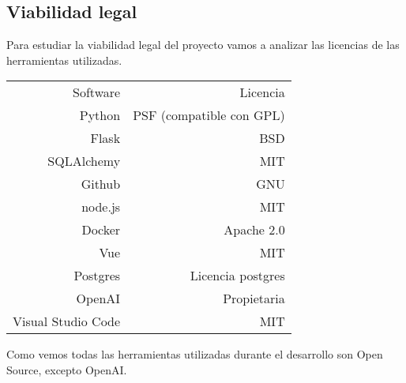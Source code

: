 \subsection{Viabilidad legal}

Para estudiar la viabilidad legal del proyecto vamos a analizar las licencias de las
herramientas utilizadas.

\begin{tabular}{r r}
    Software & Licencia\\
    Python & PSF (compatible con GPL) \\
    Flask & BSD\\
    SQLAlchemy & MIT\\
    Github & GNU\\
    node.js & MIT\\
    Docker & Apache 2.0\\
    Vue & MIT\\
    Postgres & Licencia postgres\\
    OpenAI & Propietaria\\
    Visual Studio Code & MIT \\
\end{tabular}

Como vemos todas las herramientas utilizadas durante el desarrollo son Open Source, 
excepto OpenAI.